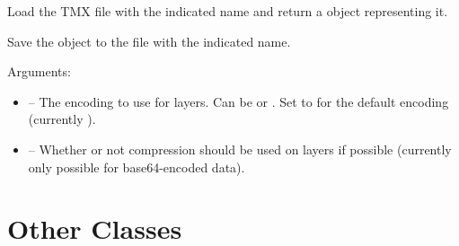 \documentclass[letterpaper,10pt,english]{sphinxmanual}
\begin{document}

\begin{fulllineitems}
\label{index:tmx.TileMap.load}
Load the TMX file with the indicated name and return a
{\hyperref[index:tmx.TileMap]{\emph{}}} object representing it.

\end{fulllineitems}


\begin{fulllineitems}
\label{index:tmx.TileMap.save}
Save the object to the file with the indicated name.

Arguments:
\begin{itemize}
\item {} 
 -- The encoding to use for layers.  Can be
 or .  Set to  for the
default encoding (currently ).

\item {} 
 -- Whether or not compression should be
used on layers if possible (currently only possible for
base64-encoded data).

\end{itemize}

\end{fulllineitems}



\chapter{Other Classes}
\label{index:other-classes}
\end{document}
